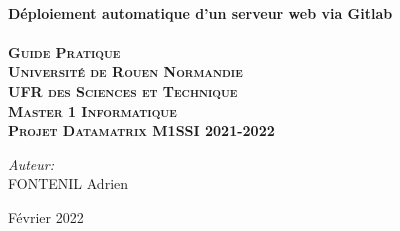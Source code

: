 \begin{titlepage}

\center %



\HRule \\[0.4cm]
{ \huge \bfseries Déploiement automatique d'un serveur web via Gitlab}\\[0.4cm] %
\HRule \\[1.5cm]

\textsc{\huge \textbf{Guide Pratique }}\\[1.5cm]

\textsc{\Large \textbf{Université de Rouen Normandie \\[0.07cm] UFR des Sciences et Technique \\[1,5cm] Master 1 Informatique\\[0.5cm] Projet Datamatrix M1SSI 2021-2022}}


\vspace{3cm}

\begin{center} \large
\Large \emph{Auteur:}\\[0.1cm]
\Large FONTENIL Adrien
\end{center}



{\large Février 2022}\\[2cm] %


\end{titlepage}
